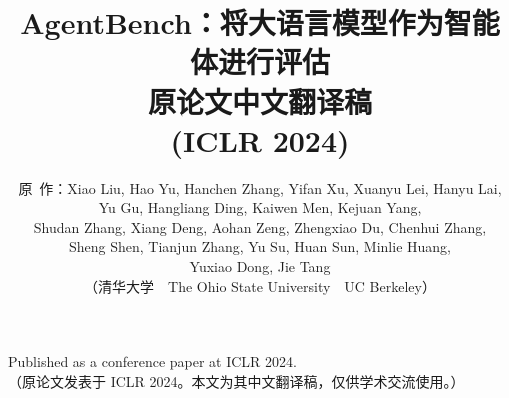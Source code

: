 \documentclass[11pt,a4paper]{article}
\title{\vspace{-1.0cm}\textbf{AgentBench：将大语言模型作为智能体进行评估}\\
\large 原论文中文翻译稿\\(ICLR 2024)}
\author{原\ 作：Xiao Liu, Hao Yu, Hanchen Zhang, Yifan Xu, Xuanyu Lei,
        Hanyu Lai, Yu Gu, Hangliang Ding, Kaiwen Men, Kejuan Yang,\\
        Shudan Zhang, Xiang Deng, Aohan Zeng, Zhengxiao Du, Chenhui Zhang,\\
        Sheng Shen, Tianjun Zhang, Yu Su, Huan Sun, Minlie Huang,\\
        Yuxiao Dong, Jie Tang\\[2pt]
        （清华大学\ \ The Ohio State University\ \ UC Berkeley）}
\date{}
\theoremstyle{definition}
\begin{document}
\maketitle

\begin{center}
\small
Published as a conference paper at ICLR 2024.\\
（原论文发表于 ICLR 2024。本文为其中文翻译稿，仅供学术交流使用。）
\end{center}






















\end{document}
